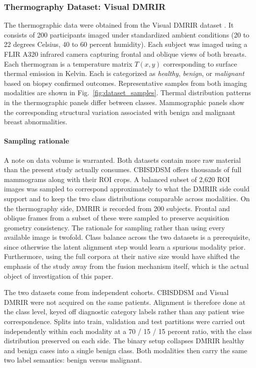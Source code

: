 \documentclass[lettersize,journal]{IEEEtran}
\begin{document}
\subsubsection{Thermography Dataset: Visual DMR\textendash IR}

The thermographic data were obtained from the Visual DMR\textendash IR dataset \cite{Moreira2014VisualDMR, Silva2018DMRIR}. It consists of 200 participants imaged under standardized ambient conditions (20 to 22 degrees Celsius, 40 to 60 percent humidity). Each subject was imaged using a FLIR A320 infrared camera capturing frontal and oblique views of both breasts. Each thermogram is a temperature matrix $T(x,y)$ corresponding to surface thermal emission in Kelvin. Each is categorized as \textit{healthy}, \textit{benign}, or \textit{malignant} based on biopsy confirmed outcomes. Representative samples from both imaging modalities are shown in Fig.~\ref{fig:dataset_samples}. Thermal distribution patterns in the thermographic panels differ between classes. Mammographic panels show the corresponding structural variation associated with benign and malignant breast abnormalities.

\paragraph{Sampling rationale} A note on data volume is warranted. Both datasets contain more raw material than the present study actually consumes. CBIS\textendash DDSM offers thousands of full mammograms along with their ROI crops. A balanced subset of 2{,}620 ROI images was sampled to correspond approximately to what the DMR\textendash IR side could support and to keep the two class distributions comparable across modalities. On the thermography side, DMR\textendash IR is recorded from 200 subjects. Frontal and oblique frames from a subset of these were sampled to preserve acquisition geometry consistency. The rationale for sampling rather than using every available image is twofold. Class balance across the two datasets is a prerequisite, since otherwise the latent alignment step would learn a spurious modality prior. Furthermore, using the full corpora at their native size would have shifted the emphasis of the study away from the fusion mechanism itself, which is the actual object of investigation of this paper.

The two datasets come from independent cohorts. CBIS\textendash DDSM and Visual DMR\textendash IR were not acquired on the same patients. Alignment is therefore done at the class level, keyed off diagnostic category labels rather than any patient wise correspondence. Splits into train, validation and test partitions were carried out independently within each modality at a 70 / 15 / 15 percent ratio, with the class distribution preserved on each side. The binary setup collapses DMR\textendash IR healthy and benign cases into a single benign class. Both modalities then carry the same two label semantics: benign versus malignant.
\end{document}
